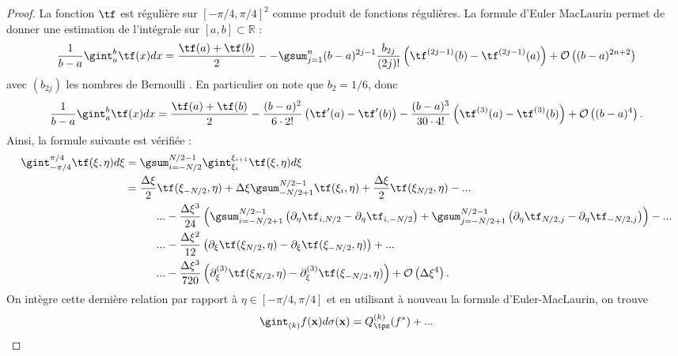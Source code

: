 \begin{proof}
La fonction $\tf$ est régulière sur $[-\pi/4, \pi/4]^2$ comme produit de fonctions régulières.
La formule d'Euler MacLaurin \cite{Demailly2016, Hardy2000, Monegato1998} permet de donner une estimation de l'intégrale sur $[a,b] \subset \mathbb{R}$ :
\begin{equation}
\dfrac{1}{b-a} \gint_a^b \tf(x) dx = \dfrac{\tf(a) + \tf(b)}{2} - - \gsum_{j=1}^n (b-a)^{2j-1} \dfrac{b_{2j}}{(2j)!} \left( \tf^{(2j-1)}(b) - \tf^{(2j-1)}(a)  \right) + \mathcal{O}\left( (b-a)^{2n+2}  \right) 
\end{equation}
avec $(b_{2j})$ les nombres de Bernoulli \cite{Conway2012}. En particulier on note que $b_2 = 1/6$, donc
\begin{equation}
\dfrac{1}{b-a} \gint_a^b \tf(x) dx = \dfrac{\tf(a) + \tf(b)}{2} - \dfrac{(b-a)^2}{6 \cdot 2!} \left( \tf'(a) - \tf'(b) \right) - \dfrac{(b-a)^3}{30 \cdot 4!} \left( \tf^{(3)}(a) - \tf^{(3)}(b) \right) + \mathcal{O}\left( (b-a)^4 \right). 
\end{equation}
Ainsi, la formule suivante est vérifiée :
\begin{align*}
\gint_{-\pi/4}^{\pi/4} \tf(\xi, \eta) d\xi & = \gsum_{i=-N/2}^{N/2-1} \gint_{\xi_i}^{\xi_{i+1}} \tf(\xi, \eta) d\xi \\
	& = \dfrac{\Delta \xi}{2} \tf(\xi_{-N/2}, \eta) + \Delta \xi \gsum_{-N/2+1}^{N/2-1} \tf(\xi_i, \eta) + \dfrac{\Delta \xi}{2} \tf(\xi_{N/2}, \eta) - ... \\
	& \hspace{1cm}... - \dfrac{\Delta \xi^3}{24} \left( \gsum_{i=-N/2+1}^{N/2-1} \left( \partial_{\eta}\tf_{i, N/2} - \partial_{\eta}\tf_{i, -N/2} \right) + \gsum_{j=-N/2+1}^{N/2-1} \left( \partial_{\eta}\tf_{N/2,j} - \partial_{\eta}\tf_{-N/2,j} \right) \right) - ...  \\
	& \hspace{1cm} ... - \dfrac{\Delta \xi^2}{12} \left(\partial_{\xi} \tf(\xi_{N/2},\eta)- \partial_{\xi} \tf(\xi_{-N/2},\eta)  \right) + ...\\
	& \hspace{1cm} ... - \dfrac{\Delta \xi^3}{720} \left(\partial_{\xi}^{(3)} \tf(\xi_{N/2},\eta)- \partial_{\xi}^{(3)}\tf(\xi_{-N/2},\eta)  \right) + \mathcal{O} \left( \Delta \xi^4 \right).
\end{align*}
On intègre cette dernière relation par rapport à $\eta \in [- \pi/4, \pi/4]$ et en utilisant à nouveau la formule d'Euler-MacLaurin, on trouve
\begin{align*}
\gint_{(k)} f(\mathbf{x})d\sigma(\mathbf{x}) & = Q_{\tpz}^{(k)}(f^*) + ... \\

\end{align*}
\end{proof}
